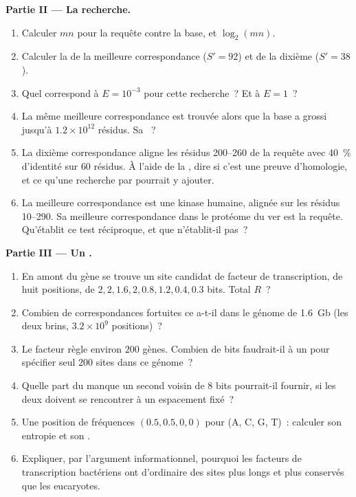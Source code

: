 \begin{problem}
\medskip
\noindent\textbf{Partie II --- La recherche.}
\begin{enumerate}[resume]
  \item Calculer $mn$ pour la requête contre la base, et
        $\log_{2}(mn)$.
  \item Calculer la  de la meilleure correspondance
        ($S' = 92$) et de la dixième ($S' = 38$).
  \item Quel  correspond à $E = 10^{-3}$ pour cette
        recherche~? Et à $E = 1$~?
  \item La même meilleure correspondance est trouvée alors que la base
        a grossi jusqu'à $1.2\times 10^{12}$ résidus. Sa ~?
  \item La dixième correspondance aligne les résidus 200--260 de la
        requête avec \qty{40}{\%} d'identité sur $60$ résidus. À l'aide
        de la , dire si c'est une preuve d'homologie, et ce
        qu'une recherche par  pourrait y ajouter.
  \item La meilleure correspondance est une kinase humaine, alignée sur
        les résidus 10--290. Sa meilleure correspondance dans le
        protéome du ver est la requête. Qu'établit ce test réciproque,
        et que n'établit-il pas~?
\end{enumerate}

\medskip
\noindent\textbf{Partie III --- Un .}
\begin{enumerate}[resume]
  \item En amont du gène se trouve un site candidat de facteur de
        transcription, de huit positions, de 
        $2, 2, 1.6, 2, 0.8, 1.2, 0.4, 0.3$ bits. Total $R$~?
  \item Combien de correspondances fortuites ce  a-t-il dans le
        génome de \qty{1.6}{Gb} (les deux brins, $3.2\times 10^{9}$
        positions)~?
  \item Le facteur règle environ $200$ gènes. Combien de bits faudrait-il
        à un  pour spécifier seul $200$ sites dans ce génome~?
  \item Quelle part du manque un second  voisin de $8$ bits
        pourrait-il fournir, si les deux doivent se rencontrer à un
        espacement fixé~?
  \item Une position de fréquences $(0.5, 0.5, 0, 0)$ pour (A, C, G,
        T)~: calculer son entropie et son .
  \item Expliquer, par l'argument informationnel, pourquoi les facteurs
        de transcription bactériens ont d'ordinaire des sites plus
        longs et plus conservés que les eucaryotes.
\end{enumerate}


\end{problem}
